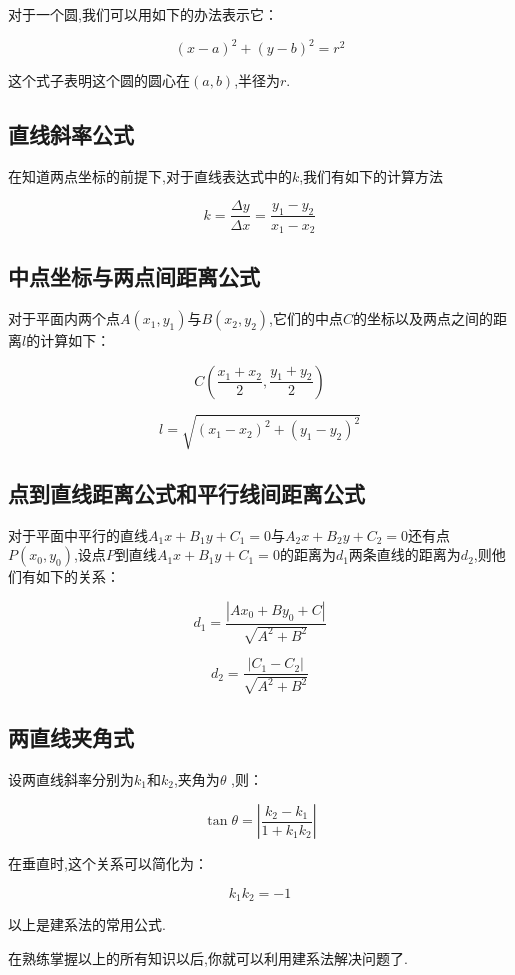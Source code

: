 \documentclass[UTF8]{ctexart}
\begin{document}
对于一个圆,我们可以用如下的办法表示它：

\[
(x-a)^2+(y-b)^2=r^2
\]

这个式子表明这个圆的圆心在$(a,b)$,半径为$r$.

\subsection{直线斜率公式}

在知道两点坐标的前提下,对于直线表达式中的$k$,我们有如下的计算方法

\[
k=\frac{\Delta y}{\Delta x}=\frac{y_1-y_2}{x_1-x_2}
\]

\subsection{中点坐标与两点间距离公式}

对于平面内两个点$A(x_1,y_1)$与$B(x_2,y_2)$,它们的中点$C$的坐标以及两点之间的距离$l$的计算如下：

\[
C(\frac{x_1+x_2}{2},\frac{y_1+y_2}{2})
\]

\[
l=\sqrt{(x_1-x_2)^2+(y_1-y_2)^2}
\]

\subsection{点到直线距离公式和平行线间距离公式}

对于平面中平行的直线$A_1x+B_1y+C_1=0$与$A_2x+B_2y+C_2=0$还有点$P(x_0,y_0)$,设点$P$到直线$A_1x+B_1y+C_1=0$的距离为$d_1$两条直线的距离为$d_2$,则他们有如下的关系：

\[
d_1=\frac{|Ax_0+By_0+C|}{\sqrt{A^2+B^2}}
\]

\[
d_2=\frac{|C_1-C_2|}{\sqrt{A^2+B^2}}
\]

\subsection{两直线夹角式}

设两直线斜率分别为$k_1$和$k_2$,夹角为$\theta$ ,则：

\[
\tan{\theta}=\left| \frac{k_2-k_1}{1+k_1k_2} \right|
\]

在垂直时,这个关系可以简化为：

\[
k_1k_2=-1
\]

以上是建系法的常用公式.

在熟练掌握以上的所有知识以后,你就可以利用建系法解决问题了.
\end{document}
